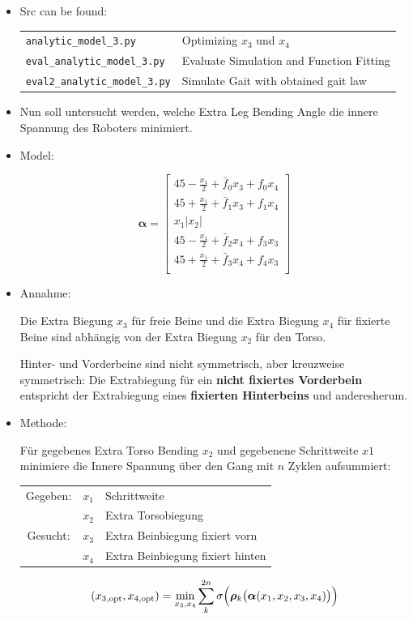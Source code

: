 \documentclass[10pt,a4paper]{article}
\begin{document}
\begin{itemize}

\item Src can be found: 

	\begin{tabular}{ll}
	\texttt{analytic\_model\_3.py} & Optimizing $x_3$ und $x_4$ \\
	\texttt{eval\_analytic\_model\_3.py} & Evaluate Simulation and Function Fitting  \\
	\texttt{eval2\_analytic\_model\_3.py} & Simulate Gait with obtained gait law \\
	\end{tabular}

\item Nun soll untersucht werden, welche Extra Leg Bending Angle die innere Spannung des Roboters minimiert.

\item Model:

\begin{equation}
\bm{\alpha} = \begin{bmatrix}
45 - \frac{x_1}{2} + \bar{f}_0x_3 + f_0x_4 \\
45 + \frac{x_1}{2} + \bar{f}_1x_3 + f_1x_4 \\
x_1|x_2| \\
45 - \frac{x_1}{2} + \bar{f}_2x_4 + f_3x_3 \\
45 + \frac{x_1}{2} + \bar{f}_3x_4 + f_4x_3 \\
\end{bmatrix}
\end{equation}


\item Annahme:

Die Extra Biegung $x_3$ für freie Beine und die Extra Biegung $x_4$ für fixierte Beine sind abhängig von der Extra Biegung $x_2$ für den Torso.

Hinter- und Vorderbeine sind nicht symmetrisch, aber kreuzweise symmetrisch:
Die Extrabiegung für ein \textbf{nicht fixiertes Vorderbein} entspricht der Extrabiegung eines \textbf{fixierten Hinterbeins} und anderesherum.


\item Methode:

Für gegebenes Extra Torso Bending $x_2$ und gegebenene Schrittweite $x1$ minimiere die Innere Spannung über den Gang mit $n$ Zyklen aufsummiert:

\begin{tabular}{c c l}
Gegeben: 	& $x_1$ & Schrittweite \\
			& $x_2$	& Extra Torsobiegung \\
Gesucht:	& $x_3$	& Extra Beinbiegung fixiert vorn \\
			& $x_4$	& Extra Beinbiegung fixiert hinten \\
\end{tabular}


\begin{equation}
 (x_{3,\textnormal{opt}}, x_{4,\textnormal{opt}}) = \min_{x_3, x_4} \sum_k^{2n} \sigma\Big(\bm{\rho}_k\big(\bm{\alpha}(x_1, x_2, x_3, x_4)\big)\Big)
\end{equation}

\end{itemize}
\end{document}
